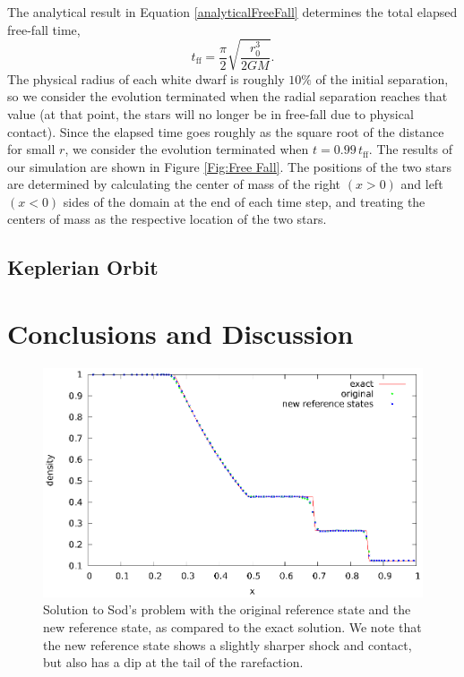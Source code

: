 \documentclass[12pt,preprint]{aastex}
\begin{document}
The analytical result in Equation \ref{analyticalFreeFall} determines
the total elapsed free-fall time,
\[
  t_{\text{ff}} = \frac{\pi}{2} \sqrt{\frac{r_0^3}{2GM}}.
\]
The physical radius of each white dwarf is roughly $10\%$ of the
initial separation, so we consider the evolution terminated when the
radial separation reaches that value (at that point, the stars will no
longer be in free-fall due to physical contact). Since the elapsed
time goes roughly as the square root of the distance for small $r$, we
consider the evolution terminated when $t = 0.99\, t_{\text{ff}}$. The
results of our simulation are shown in Figure \ref{Fig:Free Fall}. The
positions of the two stars are determined by calculating the center of
mass of the right $(x > 0)$ and left $(x < 0)$ sides of the domain at 
the end of each time step, and treating the centers of mass as the 
respective location of the two stars.


\subsection{Keplerian Orbit}\label{Sec:Kepler}

\section{Conclusions and Discussion}\label{Sec:Conclusions and Discussion}


\acknowledgments


\clearpage




\clearpage

\begin{figure}
  \centering
  \includegraphics[scale=1.0]{reference}
  \caption{ \label{Fig:sod} Solution to Sod's problem with the original
    reference state and the new reference state, as compared to the
    exact solution.  We note that the new reference state shows a
    slightly sharper shock and contact, but also has a dip at the tail
    of the rarefaction.}
\end{figure}
\end{document}

